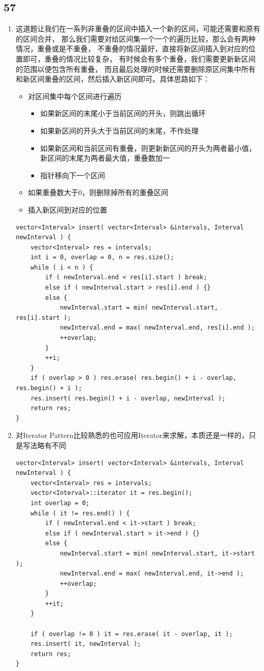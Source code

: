 \documentclass[12pt,a4paper]{article}
\begin{document}
\subsection{57}
\begin{enumerate}
\item
\begin{CJK}{UTF8}{gbsn}
这道题让我们在一系列非重叠的区间中插入一个新的区间，可能还需要和原有的区间合并，
那么我们需要对给区间集一个一个的遍历比较，那么会有两种情况，重叠或是不重叠，
不重叠的情况最好，直接将新区间插入到对应的位置即可，重叠的情况比较复杂，
有时候会有多个重叠，我们需要更新新区间的范围以便包含所有重叠，
而且最后处理的时候还需要删除原区间集中所有和新区间重叠的区间，然后插入新区间即可。具体思路如下：
\begin{itemize}
\item 对区间集中每个区间进行遍历
\begin{itemize}
\item 如果新区间的末尾小于当前区间的开头，则跳出循环
\item 如果新区间的开头大于当前区间的末尾，不作处理
\item 如果新区间和当前区间有重叠，则更新新区间的开头为两者最小值，新区间的末尾为两者最大值，重叠数加一
\item 指针移向下一个区间
\end{itemize}
\item 如果重叠数大于0，则删除掉所有的重叠区间
\item 插入新区间到对应的位置
\end{itemize}
\end{CJK}
\begin{lstlisting}
vector<Interval> insert( vector<Interval> &intervals, Interval newInterval ) {
	vector<Interval> res = intervals;
	int i = 0, overlap = 0, n = res.size();
	while ( i < n ) {
		if ( newInterval.end < res[i].start ) break;
		else if ( newInterval.start > res[i].end ) {}
		else {
			newInterval.start = min( newInterval.start, res[i].start );
			newInterval.end = max( newInterval.end, res[i].end );
			++overlap;
		}
		++i;
	}
	if ( overlap > 0 ) res.erase( res.begin() + i - overlap, res.begin() + i );
	res.insert( res.begin() + i - overlap, newInterval );
	return res;
}
\end{lstlisting}
\item
\begin{CJK}{UTF8}{gbsn}
对Iterator Pattern比较熟悉的也可应用Iterator来求解，本质还是一样的，只是写法略有不同
\end{CJK}
\begin{lstlisting}
vector<Interval> insert( vector<Interval> &intervals, Interval newInterval ) {
	vector<Interval> res = intervals;
	vector<Interval>::iterator it = res.begin();
	int overlap = 0;
	while ( it != res.end() ) {
		if ( newInterval.end < it->start ) break;
		else if ( newInterval.start > it->end ) {}
		else {
			newInterval.start = min( newInterval.start, it->start );
			newInterval.end = max( newInterval.end, it->end );
			++overlap;
		}
		++it;
	}

	if ( overlap != 0 ) it = res.erase( it - overlap, it );
	res.insert( it, newInterval );
	return res;
}
\end{lstlisting}
\end{enumerate}
\end{document}
